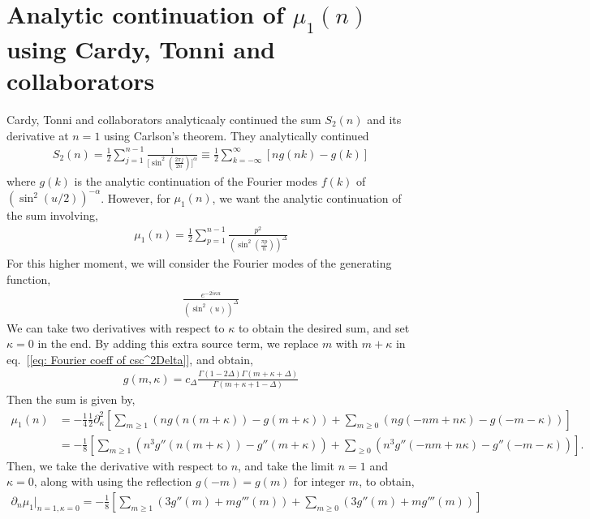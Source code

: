 \documentclass[11pt]{article}
\newcommand{\p}{\partial}
\newcommand{\nn}{\nonumber}
\newcommand{\lb}{\left(}
\newcommand{\rb}{\right)}
\begin{document}
\section{\texorpdfstring{Analytic continuation of $\mu_1(n)$ using Cardy, Tonni and collaborators}
{Analytic continuation of mu1(n) using Cardy, Tonni and collaborators}}
Cardy, Tonni and collaborators analyticaaly continued the sum $S_2(n)$ and its derivative at $n=1$ using Carlson's theorem. They analytically continued 
\begin{align*}
    S_2(n) = \frac{1}{2}\sum_{j=1}^{n-1} \frac{1}{\big[\sin^2\lb \frac{2\pi j}{2n} \rb\big]^\alpha} \equiv \frac{1}{2}\sum_{k = -\infty}^{\infty}[ng(nk)-g(k)]
\end{align*}
where $g(k)$ is the analytic continuation of the Fourier modes $f(k)$ of $\lb\sin^2(u/2)\rb^{-\alpha}$. However, for $\mu_1(n)$, we want the analytic continuation of the sum involving,
\begin{align}
    \mu_1(n) = \frac{1}{2}\sum_{p=1}^{n-1}\frac{p^2}{\lb \sin^2\lb \frac{\pi p}{n}\rb \rb^\Delta}
\end{align}
For this higher moment, we will consider the Fourier modes of the generating function,
\begin{align}
    \frac{e^{-2i\kappa u }}{(\sin^2(u))^\Delta}
\end{align}
We can take two derivatives with respect to $\kappa$ to obtain the desired sum, and set $\kappa= 0$ in the end. 
By adding this extra source term, we replace $m$ with $m + \kappa$ in eq.~[\ref{eq: Fourier coeff of csc^2Delta}], and obtain,
\begin{align}
    g(m,\kappa) = c_\Delta \frac{\Gamma(1-2\Delta) \Gamma(m + \kappa + \Delta)}{\Gamma(m+\kappa + 1 - \Delta)}
\end{align}
Then the sum is given by,
\begin{align}
    \mu_1(n) &= -\frac{1}{4}\frac{1}{2}\p_\kappa^2 \left[ \sum_{m\geq 1} \lb ng(n(m+\kappa)) - g(m+\kappa) \rb+ \sum_{m\geq 0}\lb ng(-nm+n\kappa) - g(-m-\kappa) \rb \right] \nn \\
    & = -\frac{1}{8} \left[ \sum_{m\geq 1}\lb n^3 g''(n(m+\kappa)) - g''(m+\kappa) \rb +\sum_{\geq 0}\lb n^3g''(-nm+n\kappa) -g''(-m-\kappa) \rb  \right].
\end{align}
Then, we take the derivative with respect to $n$, and take the limit $n=1$ and $\kappa = 0$, along with using the reflection $g(-m) = g(m)$ for integer $m$, to obtain,
\begin{align}
    \p_n \mu_1 \big|_{n=1,\kappa = 0} = -\frac{1}{8} \left[ \sum_{m\geq 1} \lb 3g''(m) + mg'''(m) \rb  + \sum_{m\geq 0}\lb  3g''(m) + mg'''(m) \rb\right]
\end{align}
\end{document}
